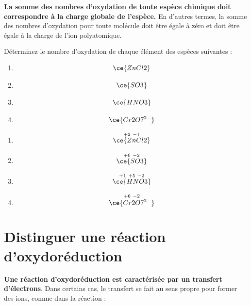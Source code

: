 \documentclass[
  11pt,
  a4paper,
  openany]{book}
\providecommand{\tightlist}{%
  \setlength{\itemsep}{0pt}\setlength{\parskip}{0pt}}
\begin{document}
\textbf{La somme des nombres d'oxydation de toute espèce chimique doit correspondre à la charge globale de l'espèce.} En d'autres termes, la somme des nombres d'oxydation pour toute molécule doit être égale à zéro et doit être égale à la charge de l'ion polyatomique.

\begin{Exercise}

Déterminez le nombre d'oxydation de chaque élément des espèces suivantes :

\begin{enumerate}
\def\labelenumi{\alph{enumi}.}
\tightlist
\item
  \[
  \ce{ZnCl2}
  \]
\item
  \[
  \ce{SO3}
  \]
\item
  \[
  \ce{HNO3}
  \]
\item
  \[
  \ce{Cr2O7^{2-}}
  \]
\end{enumerate}

\end{Exercise}

\begin{Answer}

\begin{enumerate}
\def\labelenumi{\alph{enumi}.}
\tightlist
\item
  \[
  \overset{+2\ -1}{\ce{ZnCl2}}
  \]
\item
  \[
  \overset{+6\ -2}{\ce{SO3}}
  \]
\item
  \[
  \overset{+1\ +5\ -2}{\ce{HNO3}}
  \]
\item
  \[
  \overset{+6\ -2}{\ce{Cr2O7^{2-}}}
  \]
\end{enumerate}

\end{Answer}

\clearpage

\section{Distinguer une réaction d'oxydoréduction}\label{distinguer-une-ruxe9action-doxydoruxe9duction}

\textbf{Une réaction d'oxydoréduction est caractérisée par un transfert d'électrons}. Dans certains cas, le transfert se fait au sens propre pour former des ions, comme dans la réaction :
\end{document}
